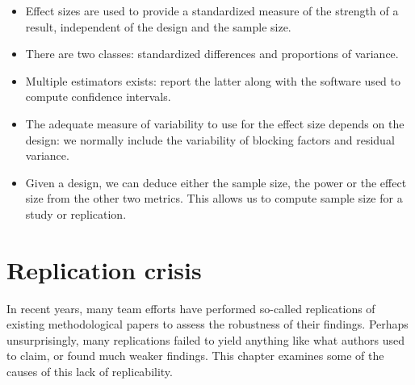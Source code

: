 \documentclass[
  11pt,
  letterpaper,
]{scrbook}
\providecommand{\tightlist}{%
  \setlength{\itemsep}{0pt}\setlength{\parskip}{0pt}}\usepackage{longtable,booktabs,array}
\theoremstyle{definition}
\theoremstyle{remark}
\begin{document}
\begin{tcolorbox}[enhanced jigsaw, breakable, toptitle=1mm, left=2mm, bottomrule=.15mm, colframe=quarto-callout-important-color-frame, colback=white, rightrule=.15mm, title=\textcolor{quarto-callout-important-color}{\faExclamation}\hspace{0.5em}{\textbf{Summary}}, opacityback=0, toprule=.15mm, titlerule=0mm, colbacktitle=quarto-callout-important-color!10!white, bottomtitle=1mm, arc=.35mm, coltitle=black, opacitybacktitle=0.6, leftrule=.75mm]

\begin{itemize}
\tightlist
\item
  Effect sizes are used to provide a standardized measure of the
  strength of a result, independent of the design and the sample size.
\item
  There are two classes: standardized differences and proportions of
  variance.
\item
  Multiple estimators exists: report the latter along with the software
  used to compute confidence intervals.
\item
  The adequate measure of variability to use for the effect size depends
  on the design: we normally include the variability of blocking factors
  and residual variance.
\item
  Given a design, we can deduce either the sample size, the power or the
  effect size from the other two metrics. This allows us to compute
  sample size for a study or replication.
\end{itemize}

\end{tcolorbox}


\hypertarget{replication-crisis}{%
\chapter{Replication crisis}\label{replication-crisis}}

In recent years, many team efforts have performed so-called replications
of existing methodological papers to assess the robustness of their
findings. Perhaps unsurprisingly, many replications failed to yield
anything like what authors used to claim, or found much weaker findings.
This chapter examines some of the causes of this lack of replicability.
\end{document}
